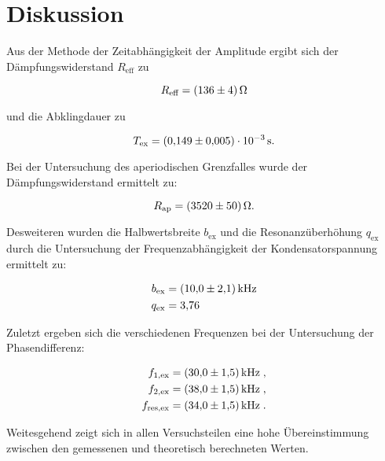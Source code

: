 \section{Diskussion}
\label{sec:Diskussion}

Aus der Methode der Zeitabhängigkeit der Amplitude ergibt sich der Dämpfungswiderstand
$R_\text{eff}$ zu

\begin{equation*}
R_\text{eff} = \SI{136+-4}{\ohm}
\end{equation*}

und die Abklingdauer zu

\begin{equation*}
T_\text{ex} = \SI{0.149+-0.005e-3}{\second}.
\end{equation*}

Bei der Untersuchung des aperiodischen Grenzfalles wurde der 
Dämpfungswiderstand ermittelt zu:

\begin{equation*}
R_\text{ap} = \SI{3520+-50}{\ohm}.
\end{equation*}

Desweiteren wurden die Halbwertsbreite $b_\text{ex}$ und die Resonanzüberhöhung $q_\text{ex}$
durch die Untersuchung der Frequenzabhängigkeit der Kondensatorspannung ermittelt zu:

\begin{align*}
b_\text{ex} &= \SI{10+-2.1}{\kilo\hertz} \\
q_\text{ex} &= \num{3.76}
\end{align*}

Zuletzt ergeben sich die verschiedenen Frequenzen bei der Untersuchung der
Phasendifferenz: 

\begin{align*}
    f_{1,\text{ex}} &= \SI{30+-1.5}{\kilo\hertz} \; ,\\
    f_{2,\text{ex}} &= \SI{38+-1.5}{\kilo\hertz} \; ,\\
    f_\text{res,ex} &= \SI{34+-1.5}{\kilo\hertz} \; .
  \end{align*}

Weitesgehend zeigt sich in allen Versuchsteilen eine hohe Übereinstimmung 
zwischen den gemessenen und theoretisch berechneten Werten.

